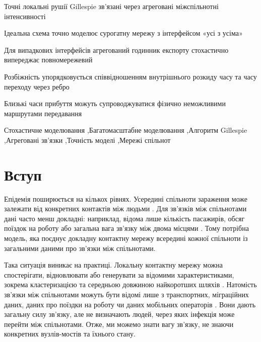 \begin{highlights}
\item Точні локальні рушії Gillespie зв'язані через агреговані міжспільнотні інтенсивності
\item Ідеальна схема точно моделює сурогатну мережу з інтерфейсом «усі з усіма»
\item Для випадкових інтерфейсів агрегований годинник експорту стохастично випереджає повномережевий
\item Розбіжність упорядковується співвідношенням внутрішнього розкиду часу та часу переходу через ребро
\item Близькі часи прибуття можуть супроводжуватися фізично неможливими маршрутами передавання
\end{highlights}

\begin{keywords}
Стохастичне моделювання \sep Багатомасштабне моделювання \sep Алгоритм Gillespie \sep Агреговані зв'язки \sep Точність моделі \sep Мережі спільнот
\end{keywords}

\maketitle

\begingroup\color{red}
\hypersetup{citecolor=red,linkcolor=red}

\section{Вступ}
\label{sec:introduction}

Епідемія поширюється на кількох рівнях. Усередині спільноти зараження може залежати від конкретних контактів між людьми \citep{keeling2005,pastorsatorras2015,kiss2017}. Для зв'язків між спільнотами дані часто менш докладні: наприклад, відома лише кількість пасажирів, обсяг поїздок на роботу або загальна вага зв'язку між двома місцями \citep{balcan2009,barbosa2018human}. Тому потрібна модель, яка поєднує докладну контактну мережу всередині кожної спільноти із загальними даними про зв'язки між спільнотами.

Така ситуація виникає на практиці. Локальну контактну мережу можна спостерігати, відновлювати або генерувати за відомими характеристиками, зокрема кластеризацією та середньою довжиною найкоротших шляхів \citep{eubank2004,danon2011}. Натомість зв'язки між спільнотами можуть бути відомі лише з транспортних, міграційних даних, даних про поїздки на роботу чи даних мобільних операторів \citep{barbosa2018human,chang2021}. Вони дають загальну силу зв'язку, але не визначають людей, через яких інфекція може перейти між спільнотами. Отже, ми можемо знати вагу зв'язку, не знаючи конкретних вузлів-мостів та їхнього стану.

